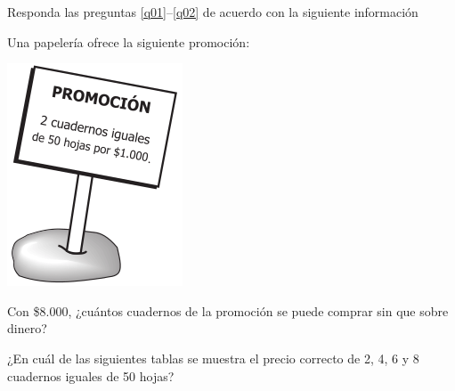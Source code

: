 \documentclass[10pt,addpoints]{exam}
\begin{document}
\begin{multicols}{2}
Responda las preguntas \ref{q01}--\ref{q02} de acuerdo con la siguiente información

Una papelería ofrece la siguiente promoción:
\begin{center}
\includegraphics[scale=.5]{Images/Pantallazo-17.png} 
\end{center}
\begin{questions}
\question \label{q01}
Con \$8.000, ¿cuántos cuadernos de la promoción se puede comprar sin que sobre dinero?

\begin{oneparchoices}
\end{oneparchoices}
\question \label{q02}
¿En cuál de las siguientes tablas se muestra el precio correcto de 2, 4, 6 y 8 cuadernos iguales de 50 hojas?


\end{questions}
\end{multicols}
\end{document}
